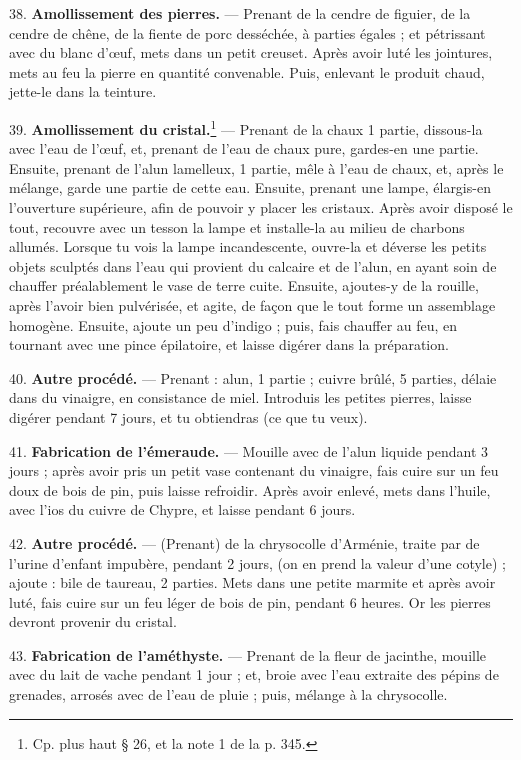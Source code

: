 \documentclass[a4paper, 11pt, oneside, polutonikogreek, french]{article}
\begin{document}
38. \textbf{Amollissement des pierres.} --- Prenant de la cendre de figuier, de la cendre de chêne, de la fiente de porc desséchée, à parties égales ; et pétrissant avec du blanc d'œuf, mets dans un petit creuset. Après avoir luté les jointures, mets au feu la pierre en quantité convenable. Puis, enlevant le produit chaud, jette-le dans la teinture.

39. \textbf{Amollissement du cristal.}\footnote{Cp. plus haut § 26, et la note 1 de la p. 345.} --- Prenant de la chaux 1 partie, dissous-la avec l'eau de l'œuf, et, prenant de l'eau de chaux pure, gardes-en une partie. Ensuite, prenant de l'alun lamelleux, 1 partie, mêle à l'eau de chaux, et, après le mélange, garde une partie de cette eau. Ensuite, prenant une lampe, élargis-en l'ouverture supérieure, afin de pouvoir y placer les cristaux. Après avoir disposé le tout, recouvre avec un tesson la lampe et installe-la au milieu de charbons allumés. Lorsque tu vois la lampe incandescente, ouvre-la et déverse les petits objets sculptés dans l'eau qui provient du calcaire et de l'alun, en ayant soin de chauffer préalablement le vase de terre cuite. Ensuite, ajoutes-y de la rouille, après l'avoir bien pulvérisée, et agite, de façon que le tout forme un assemblage homogène. Ensuite, ajoute un peu d'indigo ; puis, fais chauffer au feu, en tournant avec une pince épilatoire, et laisse digérer dans la préparation.

40. \textbf{Autre procédé.} --- Prenant : alun, 1 partie ; cuivre brûlé, 5 parties, délaie dans du vinaigre, en consistance de miel. Introduis les petites pierres, laisse digérer pendant 7 jours, et tu obtiendras (ce que tu veux).

41. \textbf{Fabrication de l'émeraude.} --- Mouille avec de l'alun liquide pendant 3 jours ; après avoir pris un petit vase contenant du vinaigre, fais cuire sur un feu doux de bois de pin, puis laisse refroidir. Après avoir enlevé, mets dans l'huile, avec l'ios du cuivre de Chypre, et laisse pendant 6 jours.

42. \textbf{Autre procédé.} --- (Prenant) de la chrysocolle d'Arménie, traite par de l'urine d'enfant impubère, pendant 2 jours, (on en prend la valeur d'une cotyle) ; ajoute : bile de taureau, 2 parties. Mets dans une petite marmite et après avoir luté, fais cuire sur un feu léger de bois de pin, pendant 6 heures. Or les pierres devront provenir du cristal.

43. \textbf{Fabrication de l'améthyste.} --- Prenant de la fleur de jacinthe, mouille avec du lait de vache pendant 1 jour ; et, broie avec l'eau extraite des pépins de grenades, arrosés avec de l'eau de pluie ; puis, mélange à la chrysocolle.
\end{document}
